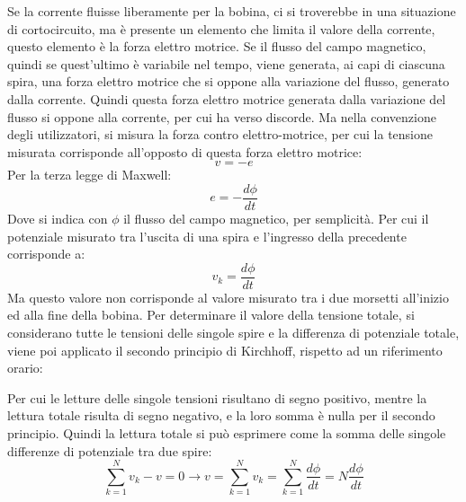 \documentclass{article}
\numberwithin{equation}{subsection}
\begin{document}
Se la corrente fluisse liberamente per la bobina, ci si troverebbe in una situazione di cortocircuito, ma è presente un elemento che limita il valore della corrente, questo 
elemento è la forza elettro motrice. 
Se il flusso del campo magnetico, quindi se quest'ultimo è variabile nel tempo, viene generata, ai capi di ciascuna spira, una forza elettro motrice che si oppone alla variazione 
del flusso, generato dalla corrente. Quindi questa forza elettro motrice generata dalla variazione del flusso si oppone alla corrente, per cui ha verso discorde. Ma nella 
convenzione degli utilizzatori, si misura la forza contro elettro-motrice, per cui la tensione misurata corrisponde all'opposto di questa forza elettro motrice: 
\begin{equation*}
    v=-e
\end{equation*}
Per la terza legge di Maxwell:
\begin{equation*}
    e=-\displaystyle\frac{d\phi}{dt}
\end{equation*}
Dove si indica con $\phi$ il flusso del campo magnetico, per semplicità. Per cui il potenziale misurato tra l'uscita di una spira e l'ingresso della precedente corrisponde a:
\begin{equation*}
    v_k=\displaystyle\frac{d\phi}{dt}
\end{equation*}
Ma questo valore non corrisponde al valore misurato tra i due morsetti all'inizio ed alla fine della bobina. Per determinare il valore della tensione totale, si considerano 
tutte le tensioni delle singole spire e la differenza di potenziale totale, viene poi applicato il secondo principio di Kirchhoff, rispetto ad un riferimento orario:
\begin{center}
\end{center}
Per cui le letture delle singole tensioni risultano di segno positivo, mentre la lettura totale risulta di segno negativo, e la loro somma è nulla per il secondo principio. 
Quindi la lettura totale si può esprimere come la somma delle singole differenze di potenziale tra due spire:
\begin{equation*}
    \displaystyle\sum_{k=1}^Nv_k-v=0\to v=\sum_{k=1}^Nv_k=\sum_{k=1}^N\frac{d\phi}{dt}=N\frac{d\phi}{dt}
\end{equation*}
\end{document}
